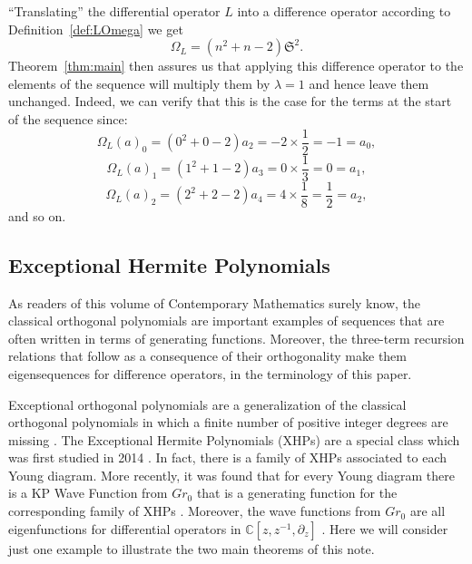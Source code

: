 \documentclass{amsart}
\theoremstyle{definition}
\theoremstyle{remark}
\numberwithin{equation}{section}
\def\S{\mathfrak{S}}
\begin{document}
``Translating'' the differential operator $L$ into a difference
operator according to Definition~\ref{def:LOmega} we get
$$
\Omega_L=(n^2+n-2)\S^2.
$$
Theorem~\ref{thm:main} then assures us that applying this difference operator to the elements of the sequence will multiply
them by $\lambda=1$ and hence leave them unchanged.  Indeed, we can
verify that this is the case for the terms at the start of the sequence
since:
$$
\Omega_L(a)_0=(0^2+0-2)a_2=-2\times\frac12=-1=a_0,
$$
$$\Omega_L(a)_1=(1^2+1-2)a_3=0\times\frac13=0=a_1,
$$
$$
\Omega_L(a)_2=(2^2+2-2)a_4=4\times\frac18=\frac12=a_2,
$$
and so on.



\subsection{Exceptional Hermite Polynomials}\label{sec:examp2}
As readers of this volume of Contemporary Mathematics surely know, the classical
orthogonal polynomials are important examples of sequences that are
often written in terms of generating functions.  Moreover, the
three-term recursion relations that follow as a consequence of their
orthogonality make them eigensequences for difference operators, in
the terminology of this paper.

Exceptional orthogonal polynomials are a generalization of the
classical orthogonal polynomials in which a finite number of positive
integer degrees are missing \cite{UllateKamranMilson2009}.  The
Exceptional Hermite Polynomials (XHPs) are a special class which was first
studied in 2014 \cite{UllateGrandatiMilsonXHPS}.  In fact, there is a
family of XHPs associated to each Young diagram. More recently, it
was found that for every Young diagram there is a  KP Wave Function
from $Gr_0$ that is a generating function for the corresponding family
of XHPs \cite{MilsonKasman2020}.  Moreover, the wave functions from $Gr_0$ are all
eigenfunctions for differential operators in $\mathbb{C}[z,z^{-1},\partial_z]$
\cite{Wilson1993}.  Here we will consider just one example to
illustrate the two main theorems of this note.

\end{document}
